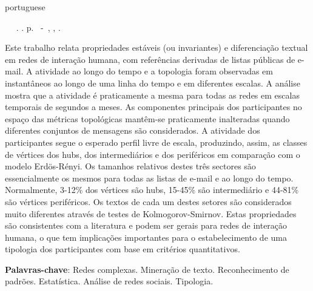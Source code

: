 \documentclass[
12pt,		%
openright,	%
twoside,  %
a4paper,			%
chapter=TITLE,		%
english,			%
french,				%
spanish,			%
brazil				%
]{USPSC}
\begin{document}
\setlength{\absparsep}{18pt} %
\begin{resumo}[Resumo]
 \begin{otherlanguage*}{portuguese}
	\begin{flushleft} 
			\setlength{\absparsep}{0pt} %
			\SingleSpacing 
			\imprimirautorabr~ ~\textbf{\imprimirtitulo}.	\imprimirdata. \pageref{LastPage}p. 
			\imprimirtipotrabalho~-~\imprimirinstituicao, \imprimirlocal, \imprimirdata. 
 	\end{flushleft}
\OnehalfSpacing 			
	 Este trabalho relata propriedades estáveis (ou invariantes) e diferenciação textual em redes de interação humana,
	 com referências derivadas de listas públicas de e-mail.
	 A atividade ao longo do tempo e a topologia foram observadas em instantâneos ao longo de uma linha do tempo e em
	 diferentes escalas.
	 A análise mostra que a atividade é praticamente a mesma para todas as redes em escalas temporais
	 de segundos a meses.
	 As componentes principais dos participantes no espaço das métricas topológicas
	 mantêm-se praticamente inalteradas quando diferentes conjuntos de mensagens são considerados.
	 A atividade dos participantes
	 segue o esperado perfil livre de escala, produzindo, assim, as classes de vértices dos hubs, dos intermediários e dos periféricos em
	 comparação com o modelo Erdös-Rényi.
	 Os tamanhos relativos destes três sectores são essencialmente os mesmos
	 para todas as listas de e-mail e ao longo do tempo.
	 Normalmente, 3-12\% dos vértices são hubs, 15-45\% são intermediário
	 e 44-81\% são vértices periféricos.
	 Os textos de cada um destes setores são considerados muito diferentes através de testes de Kolmogorov-Smirnov.
	 Estas propriedades são consistentes com a literatura e podem ser gerais para
	 redes de interação humana, o que tem implicações importantes para o estabelecimento de uma tipologia dos participantes com base em
	 critérios quantitativos.

 \textbf{Palavras-chave}: Redes complexas. Mineração de texto. Reconhecimento de padrões. Estatística. Análise de redes sociais. Tipologia.
 \end{otherlanguage*}
\end{resumo}
\end{document}

